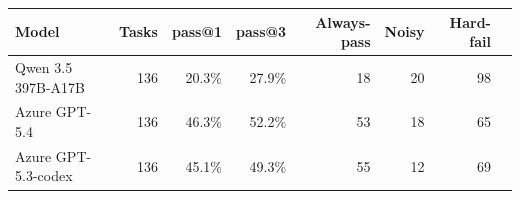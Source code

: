 \begin{tabular}{lrrrrrrr}
\toprule
Model & Tasks & pass@1 & pass@3 & Always-pass & Noisy & Hard-fail \\
\midrule
Qwen 3.5 397B-A17B & 136 & 20.3\% & 27.9\% & 18 & 20 & 98 \\
Azure GPT-5.4 & 136 & 46.3\% & 52.2\% & 53 & 18 & 65 \\
Azure GPT-5.3-codex & 136 & 45.1\% & 49.3\% & 55 & 12 & 69 \\
\bottomrule
\end{tabular}
